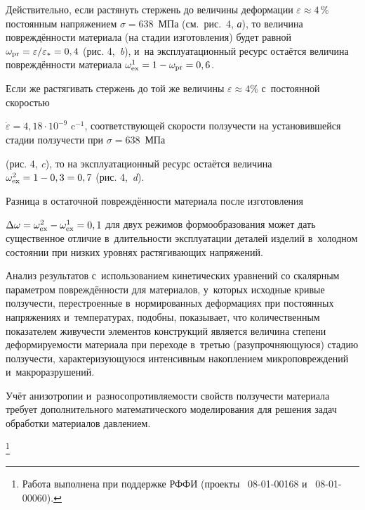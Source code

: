 Действительно, если растянуть стержень до величины деформации  \mbox{$\varepsilon\approx 4\,\%$} постоянным напряжением $\sigma

=638$~МПа (см.~рис.~4, {\sl а}), то величина повреждённости материала (на стадии изготовления) будет равной $\omega_{\rm pr}=\varepsilon/\varepsilon_{*} =0,4$ (рис. 4,~{\sl b}), и~на эксплуатационный ресурс остаётся  величина повреждённости материала $\omega^{1}_{\rm ex}=1-\omega_{\rm pr}=0,6$.

Если же растягивать стержень до той же величины  $\varepsilon\approx 4\%$ с~постоянной скоростью

$\dot{\varepsilon}=4,18\cdot10^{-9}\text{~c}^{-1}$, соответствующей скорости ползучести на установившейся стадии ползучести при $\sigma=638$~МПа

(рис. 4, {\sl c}), то на эксплуатационный ресурс остаётся величина $\omega^{2}_{\rm ex}=1-0,3=0,7$ (рис. 4,~{\sl d}).



Разница в остаточной повреждённости материала после изготовления \linebreak 

$\Delta\omega=\omega^{2}_{\rm ex}-\omega^{1}_{\rm ex}=0,1$  для двух режимов формообразования может дать существенное отличие в~длительности эксплуатации деталей изделий в~холодном состоянии при низких уровнях растягивающих напряжений.



Анализ результатов с~использованием кинетических уравнений со скалярным параметром повреждённости для материалов, у~которых исходные кривые ползучести, перестроенные в~нормированных деформациях при постоянных напряжениях и~температурах, подобны, показывает, что количественным показателем живучести элементов конструкций является величина степени деформируемости материала при переходе в~третью (разупрочняющуюся) стадию ползучести, характеризующуюся интенсивным накоплением микроповреждений и~макроразрушений.

Учёт анизотропии и~разносопротивляемости свойств ползучести материала требует дополнительного математического моделирования для решения задач обработки материалов давлением.





\thanks{Работа выполнена при поддержке РФФИ {\rm (}проекты {\rm \No~08-01-00168} и \rm \No~08-01-00060).}



